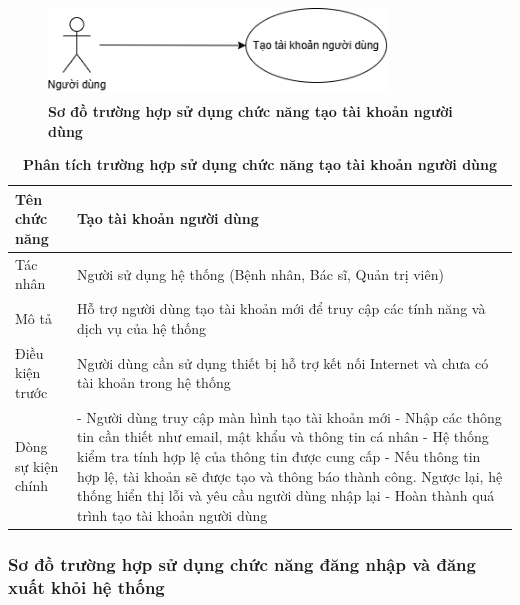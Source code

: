 \begin{figure}[H]
	\centering
	\includegraphics[width=9cm,height=2.5cm]{Images/use_case/use_case_register.png}
	\caption[Sơ đồ trường hợp sử dụng chức năng tạo tài khoản người dùng của hệ thống]{\bfseries \fontsize{12pt}{0pt}
		\selectfont Sơ đồ trường hợp sử dụng chức năng tạo tài khoản người dùng}
	\label{use_case_register} %
\end{figure}

\begin{table}[H]
	\caption{\bfseries \fontsize{12pt}{0pt}\selectfont Phân tích trường hợp sử dụng chức năng tạo tài khoản người dùng}
	\centering
	\begin{tabularx}{\textwidth}{|X|X|}
		\hline
		\textbf{Tên chức năng} & \textbf{Tạo tài khoản người dùng}                                                           \\
		\hline
		Tác nhân               & Người sử dụng hệ thống (Bệnh nhân, Bác sĩ, Quản trị viên)                                   \\
		\hline
		Mô tả                  & Hỗ trợ người dùng tạo tài khoản mới để truy cập các tính năng và dịch vụ của hệ thống       \\
		\hline
		Điều kiện trước        & Người dùng cần sử dụng thiết bị hỗ trợ kết nối Internet và chưa có tài khoản trong hệ thống \\
		\hline
		Dòng sự kiện chính     &
		- Người dùng truy cập màn hình tạo tài khoản mới \newline
		- Nhập các thông tin cần thiết như email, mật khẩu và thông tin cá nhân \newline
		- Hệ thống kiểm tra tính hợp lệ của thông tin được cung cấp \newline
		- Nếu thông tin hợp lệ, tài khoản sẽ được tạo và thông báo thành công. Ngược lại, hệ thống hiển thị lỗi và yêu cầu người dùng nhập lại \newline
		- Hoàn thành quá trình tạo tài khoản người dùng                                                                      \\
		\hline
	\end{tabularx}
\end{table}

\subsubsection{Sơ đồ trường hợp sử dụng chức năng đăng nhập và đăng xuất khỏi hệ thống}

